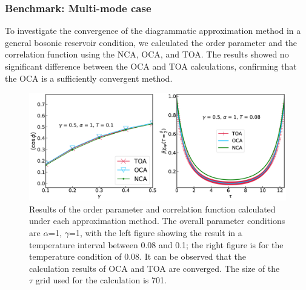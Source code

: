 \documentclass{article}[12pt]
\begin{document}
\begin{spacing}{1.3}
\subsubsection*{Benchmark: Multi-mode case}
To investigate the convergence of the diagrammatic approximation method in a general bosonic reservoir condition, 
we calculated the order parameter and the correlation function using the NCA, OCA, and TOA. 
The results showed no significant difference between the OCA and TOA calculations, confirming that the OCA is a sufficiently convergent method.
\begin{figure}[H]
  \centerline{\includegraphics[width=13cm]{TexFigure/4/4_1_02_Multi.png}}
  \caption{Results of the order parameter and correlation function calculated under each approximation method. 
  The overall parameter conditions are $\alpha$=1, $\gamma$=1, with the left figure showing the result in a temperature interval between 0.08 and 0.1; the right figure is for the temperature condition of 0.08. It can be observed that the calculation results of OCA and TOA are converged. 
  The size of the $\tau$ grid used for the calculation is 701.}
 \end{figure}

\end{spacing}
\end{document}
